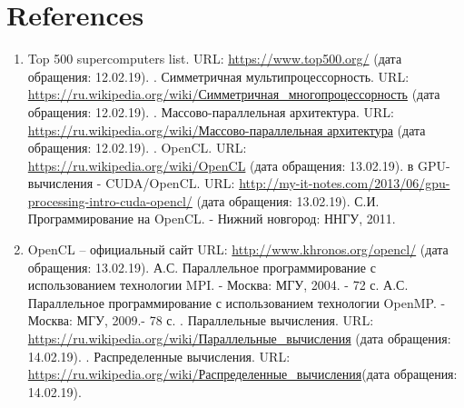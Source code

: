 { %
	\section*{References}
	\begin{enumerate}
		\sloppy
		 В.В., Балакшин П.В. Введение в параллельные вычисления. – СПб: Университет ИТМО, 2016. – 51 с.
		\item Top 500 supercomputers list. URL: \href{https://www.top500.org/} {https://www.top500.org/} (дата обращения: 12.02.19).
		. Симметричная мультипроцессорность. URL: \href{https://ru.wikipedia.org/wiki/%D0%A1%D0%B8%D0%BC%D0%BC%D0%B5%D1%82%D1%80%D0%B8%D1%87%D0%BD%D0%B0%D1%8F_%D0%BC%D0%BD%D0%BE%D0%B3%D0%BE%D0%BF%D1%80%D0%BE%D1%86%D0%B5%D1%81%D1%81%D0%BE%D1%80%D0%BD%D0%BE%D1%81%D1%82%D1%8C}{https://ru.wikipedia.org/wiki/Симметричная\_многопроцессорность} (дата обращения: 12.02.19).
		. Массово-параллельная архитектура. URL: \href{https://ru.wikipedia.org/wiki/%D0%9C%D0%B0%D1%81%D1%81%D0%BE%D0%B2%D0%BE-%D0%BF%D0%B0%D1%80%D0%B0%D0%BB%D0%BB%D0%B5%D0%BB%D1%8C%D0%BD%D0%B0%D1%8F_%D0%B0%D1%80%D1%85%D0%B8%D1%82%D0%B5%D0%BA%D1%82%D1%83%D1%80%D0%B0}{https://ru.wikipedia.org/wiki/Массово-параллельная архитектура} (дата обращения: 12.02.19).
		. OpenCL. URL: \href{https://ru.wikipedia.org/wiki/OpenCL}{https://ru.wikipedia.org/wiki/OpenCL} (дата обращения: 13.02.19).
		 в GPU-вычисления - CUDA/OpenCL. URL: \href{http://my-it-notes.com/2013/06/gpu-processing-intro-cuda-opencl/}{http://my-it-notes.com/2013/06/gpu-processing-intro-cuda-opencl/} (дата обращения: 13.02.19).
		 С.И. Программирование на OpenCL. - Нижний новгород: ННГУ, 2011.
		\item OpenCL – официальный сайт URL: \href{http://www.khronos.org/opencl/}{http://www.khronos.org/opencl/} (дата обращения: 13.02.19).
		 А.С. Параллельное программирование с использованием технологии MPI. - Москва: МГУ, 2004. - 72 с.
		 А.С. Параллельное программирование с использованием технологии OpenMP. - Москва: МГУ, 2009.- 78 с.
		. Параллельные вычисления. URL: \href{https://ru.wikipedia.org/wiki/%D0%9F%D0%B0%D1%80%D0%B0%D0%BB%D0%BB%D0%B5%D0%BB%D1%8C%D0%BD%D1%8B%D0%B5_%D0%B2%D1%8B%D1%87%D0%B8%D1%81%D0%BB%D0%B5%D0%BD%D0%B8%D1%8F} {https://ru.wikipedia.org/wiki/Параллельные\_вычисления} (дата обращения: 14.02.19).
		. Распределенные вычисления. URL: \href{https://ru.wikipedia.org/wiki/%D0%A0%D0%B0%D1%81%D0%BF%D1%80%D0%B5%D0%B4%D0%B5%D0%BB%D1%91%D0%BD%D0%BD%D1%8B%D0%B5_%D0%B2%D1%8B%D1%87%D0%B8%D1%81%D0%BB%D0%B5%D0%BD%D0%B8%D1%8F} {https://ru.wikipedia.org/wiki/Распределенные\_вычисления}(дата обращения: 14.02.19).

\end{enumerate}}
